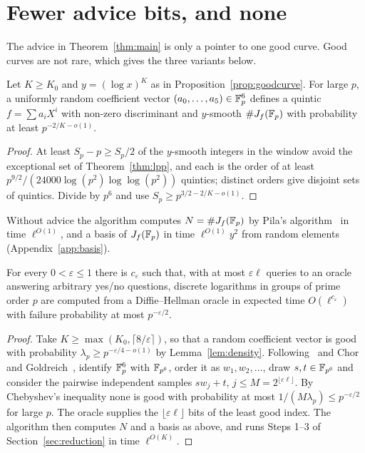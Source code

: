 \section{Fewer advice bits, and none}\label{sec:fewer}

The advice in Theorem~\ref{thm:main} is only a pointer to one good curve. Good curves are not rare, which
gives the three variants below.

\begin{lemma}\label{lem:density}
Let $K\ge K_0$ and $y=(\log x)^K$ as in Proposition~\ref{prop:goodcurve}. For large $p$, a uniformly random
coefficient vector $(a_0,\dots,a_5)\in\mathbb{F}_p^6$ defines a quintic $f=\sum a_iX^i$ with non-zero discriminant and
$y$-smooth $\#J_f(\mathbb{F}_p)$ with probability at least $p^{-2/K-o(1)}$.
\end{lemma}

\begin{proof}
At least $S_p-p\ge S_p/2$ of the $y$-smooth integers in the window avoid the exceptional set of
Theorem~\ref{thm:lpp}, and each is the order of at least $p^{9/2}/(24000\log(p^2)\log\log(p^2))$ quintics;
distinct orders give disjoint sets of quintics. Divide by $p^6$ and use $S_p\ge p^{3/2-2/K-o(1)}$.
\end{proof}

Without advice the algorithm computes $N=\#J_f(\mathbb{F}_p)$ by Pila's algorithm~\cite{Pil90,AH01} in time
$\ell^{O(1)}$, and a basis of $J_f(\mathbb{F}_p)$ in time $\ell^{O(1)}y^2$ from random elements
(Appendix~\ref{app:basis}).

\begin{theorem}\label{thm:eps}
For every $0<\varepsilon\le1$ there is $c_\varepsilon$ such that, with at most $\varepsilon\ell$ queries to an oracle answering arbitrary yes/no questions, discrete
logarithms in groups of prime order $p$ are computed from a Diffie--Hellman oracle in expected time
$O(\ell^{c_\varepsilon})$ with failure probability at most $p^{-\varepsilon/2}$.
\end{theorem}

\begin{proof}
Take $K\ge\max(K_0,\lceil8/\varepsilon\rceil)$, so that a random coefficient vector is good with probability
$\lambda_p\ge p^{-\varepsilon/4-o(1)}$ by Lemma~\ref{lem:density}. Following~\cite[\S7]{KMS10} and Chor and
Goldreich~\cite{CG89}, identify $\mathbb{F}_p^6$ with $\mathbb{F}_{p^6}$, order it as $w_1,w_2,\dots$, draw $s,t\in\mathbb{F}_{p^6}$
and consider the pairwise independent samples $sw_j+t$, $j\le M=2^{\lfloor\varepsilon\ell\rfloor}$. By
Chebyshev's inequality none is good with probability at most $1/(M\lambda_p)\le p^{-\varepsilon/2}$ for large
$p$. The oracle supplies the $\lfloor\varepsilon\ell\rfloor$ bits of the least good index. The algorithm
then computes $N$ and a basis as above, and runs Steps 1--3 of Section~\ref{sec:reduction} in time
$\ell^{O(K)}$.
\end{proof}

